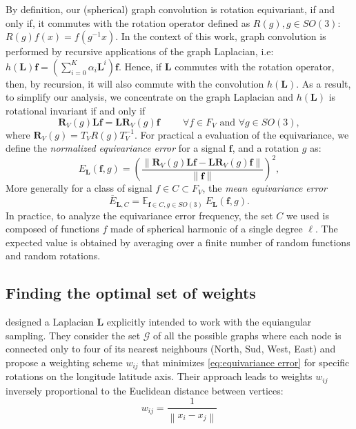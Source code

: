 \documentclass{article} %
\newcommand{\norm}[1]{\left\lVert#1\right\rVert}
\renewcommand{\b}[1]{{\bm{#1}}}   %
\newcommand{\nati}[1]{{\color[rgb]{.3,.5,.9}{#1}}}
\newcommand{\mart}[1]{{\color[rgb]{.9,.5,.3}{#1}}}
\begin{document}
By definition, our (spherical) graph convolution is rotation equivariant, if and only if, it commutes with the rotation operator defined as $R(g), g\in SO(3)$: $R(g) f(x) = f\left(g^{-1} x \right)$.
In the context of this work, graph convolution is performed by recursive applications of the graph Laplacian, i.e: $h(\b{L}) \b{f} = \left(\sum_{i=0}^K \alpha_i \b{L}^i\right) \b{f}$\nati{Put this equation somewhere else?}.  Hence, if $\b{L}$ commutes with the rotation operator, then, by recursion, it will also commute with the convolution $h(\b{L})$.
As a result, to simplify our analysis, we concentrate on the graph Laplacian and $h(\b{L})$ is rotational invariant if and only if
\mart{Correct formula for equivariance error and the corresponding plots as soon as you changed it!}
\begin{equation} \label{eq:equivariance}
	\b{R}_V(g) \b{L} \b{f} = \b{L} \b{R}_V(g) \b{f} \hspace{1cm} \forall f\in F_V \text{ and } \forall g\in SO(3),
\end{equation}
where $\b{R}_V(g) = T_V R(g) T_V^{-1}$. For practical a evaluation of the equivariance, we define the \textit{normalized equivariance error} for a signal $\b{f}$, and a  rotation $g$ as:
\begin{equation} \label{eq:equivariance error}
	E_{\b{L}}(\b{f}, g) = \left(\frac{ \norm {\b{R}_V(g) \b{L} \b{f} - \b{L} \b{R}_V(g) \b{f}} }{\norm {\b{f}}}\right)^2,
\end{equation}
More generally for a class of signal $f \in C \subset F_V$, the \textit{mean equivariance error}
\begin{equation} \label{eq:mean equivariance error}
	\overline E_{\b{L}, C} = \mathbb E_{\b{f}\in C, g\in SO(3)} \ E_{\b{L}}(\b{f}, g).
\end{equation}
\mart{Talk about the probability measure used on C, SO(3)?}
In practice, to analyze the equivariance error frequency,  the set $C$ we used is composed of functions $f$ made of spherical harmonic of a single degree $\ell$.
The expected value is obtained by averaging over a finite number of random functions and random rotations.

\subsection{Finding the optimal set of weights}
\cite{khasanova2017sphericalcnn} designed a Laplacian $\b{L}$ explicitly intended to work with the equiangular sampling.
They consider the set $\mathcal{G}$ of all the possible graphs where each node is connected only to four of its nearest neighbours (North, Sud, West, East) and propose a weighting scheme $w_{ij}$ that minimizes \eqref{eq:equivariance error} for specific rotations on the longitude latitude axis.
Their approach leads to weights $w_{ij}$ inversely proportional to the Euclidean distance between vertices:
\begin{equation} \label{eq:frossard weights}
	w_{ij} = \frac{1}{\norm{x_i-x_j}}
\end{equation}
\end{document}

